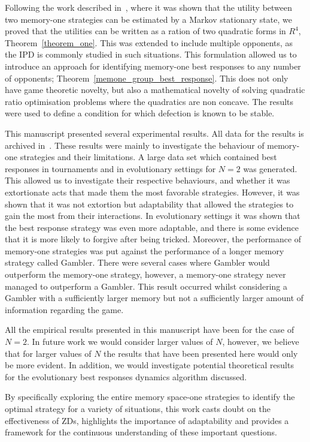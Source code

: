 \documentclass[9pt,twocolumn,twoside,lineno]{pnas-new}
\begin{document}
Following the work described in~\cite{Nowak1989}, where it was shown that the
utility between two memory-one strategies can be estimated by a Markov
stationary state, we proved that the utilities can be written as a ration of two
quadratic forms in $R^4$, Theorem~\ref{theorem_one}. This was extended to
include multiple opponents, as the IPD is commonly studied in such situations.
This formulation allowed us to introduce an approach for identifying memory-one
best responses to any number of opponents;
Theorem~\ref{memone_group_best_response}. This does not only have game theoretic
novelty, but also a mathematical novelty of solving quadratic ratio optimisation
problems where the quadratics are non concave. The results were used to
define a condition for which defection is known to be stable.

This manuscript presented several experimental results. All data for the results
is archived in~\cite{glynatsi2019}. These results were mainly to investigate the
behaviour of memory-one strategies and their limitations. A large data set which
contained best responses in tournaments and in evolutionary settings for $N=2$
was generated. This allowed us to investigate their respective behaviours, and
whether it was extortionate acts that made them the most favorable strategies.
However, it was shown that it was not extortion but adaptability that allowed
the strategies to gain the most from their interactions. In evolutionary settings
it was shown that the best response strategy was even more adaptable, and there
is some evidence that it is more likely to forgive after being tricked.
Moreover, the performance of
memory-one strategies was put against the performance of a longer memory
strategy called Gambler. There were several cases where Gambler would outperform
the memory-one strategy, however, a memory-one strategy never managed to
outperform a Gambler. This result occurred whilst considering a Gambler with a
sufficiently larger memory but not a sufficiently larger amount of information
regarding the game.

All the empirical results presented in this manuscript have been for the case of
$N=2$. In future work we would consider larger values of $N$, however, we
believe that for larger values of $N$ the results that have been presented here
would only be more evident. In addition, we would investigate potential
theoretical results for the evolutionary best responses dynamics algorithm
discussed.

By specifically exploring the entire memory space-one strategies to identify
the optimal strategy for a variety of situations, this work casts doubt
on the effectiveness of ZDs, highlights the importance of adaptability and provides
a framework for the continuous understanding of these important questions.
\end{document}
